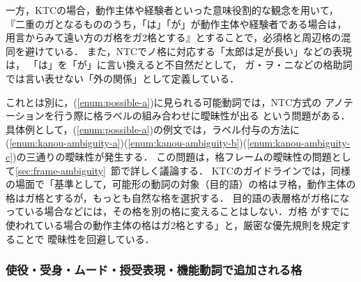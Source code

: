 \documentclass[japanese]{jnlp_1.4}
\begin{document}
一方，KTCの場合，動作主体や経験者といった意味役割的な観念を用いて，
『二重のガとなるもののうち，「は」「が」が動作主体や経験者である場合は，
用言からみて遠い方のガ格をガ2格とする』とすることで，必須格と周辺格の混同を避けている．
また，NTCでノ格に対応する「太郎は足が長い」などの表現は，
「は」を「が」に言い換えると不自然だとして，
ガ・ヲ・ニなどの格助詞では言い表せない「外の関係」として定義している．

これとは別に，(\ref{enum:possible-a})に見られる可能動詞では，NTC方式の
アノテーションを行う際に格ラベルの組み合わせに曖昧性が出る
という問題がある．具体例として，(\ref{enum:possible-a})の例文では，ラベル付与の方法に
(\ref{enum:kanou-ambiguity-a})(\ref{enum:kanou-ambiguity-b})(\ref{enum:kanou-ambiguity-c})の三通りの曖昧性が発生する．
この問題は，格フレームの曖昧性の問題として\ref{sec:frame-ambiguity}~節で詳しく議論する．
KTCのガイドラインでは，同様の場面で「基準として，可能形の動詞の対象（目的語）の格はヲ格，動作主体の格はガ格とするが，もっとも自然な格を選択する．
目的語の表層格がガ格になっている場合などには，その格を別の格に変えることはしない．ガ格
がすでに使われている場合の動作主体の格はガ2格とする」と，厳密な優先規則を規定することで
曖昧性を回避している．


\subsubsection{使役・受身・ムード・授受表現・機能動詞で追加される格}
\label{sec:additional-cases}
\end{document}
